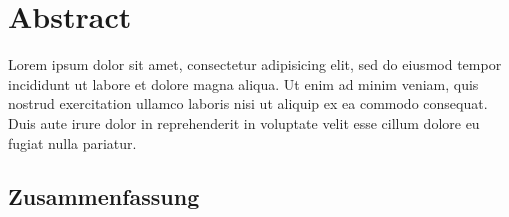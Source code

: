 \chapter*{Abstract}

\authorAll
Lorem ipsum dolor sit amet, consectetur adipisicing elit, sed do eiusmod tempor incididunt ut labore et dolore magna aliqua. Ut enim ad minim veniam, quis nostrud exercitation ullamco laboris nisi ut aliquip ex ea commodo consequat. Duis aute irure dolor in reprehenderit in voluptate velit esse cillum dolore eu fugiat nulla pariatur.






\cleardoublepage
\begin{otherlanguage}{ngerman}
\chapter*{Zusammenfassung}%

\authorAll
{}





\end{otherlanguage}
